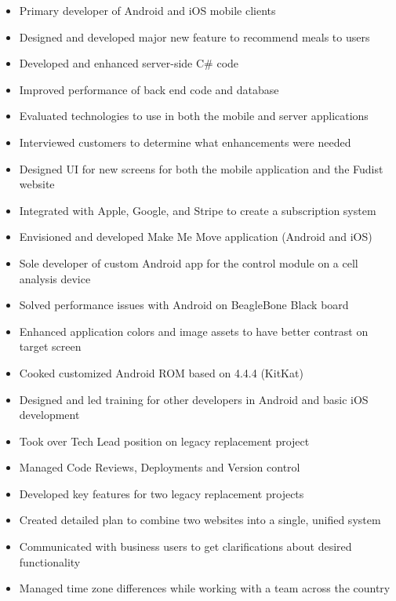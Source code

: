 \documentclass[12pt,letterpaper,sans]{moderncv}
\begin{document}
	\begin{itemize}[leftmargin=1.24in]
		\item Primary developer of Android and iOS mobile clients
		\item Designed and developed major new feature to recommend meals to users
		\item Developed and enhanced server-side C\# code
		\item Improved performance of back end code and database
		\item Evaluated technologies to use in both the mobile and server applications
		\item Interviewed customers to determine what enhancements were needed
		\item Designed UI for new screens for both the mobile application and the Fudist website
		\item Integrated with Apple, Google, and Stripe to create a subscription system	
		\item Envisioned and developed Make Me Move application (Android and iOS)
	\end{itemize}
	\begin{itemize}[leftmargin=1.24in]
		\item Sole developer of custom Android app for the control module on a cell analysis device
		\item Solved performance issues with Android on BeagleBone Black board
		\item Enhanced application colors and image assets to have better contrast on target screen
		\item Cooked customized Android ROM based on 4.4.4 (KitKat)
		\item Designed and led training for other developers in Android and basic iOS development
	\end{itemize}
\newpage
{}   
	\begin{itemize}[leftmargin=1.24in]
		\item Took over Tech Lead position on legacy replacement project
		\item Managed Code Reviews, Deployments and Version control
		\item Developed key features for two legacy replacement projects
		\item Created detailed plan to combine two websites into a single, unified system
		\item Communicated with business users to get clarifications about desired functionality
		\item Managed time zone differences while working with a team across the country
	\end{itemize} 
\end{document}
